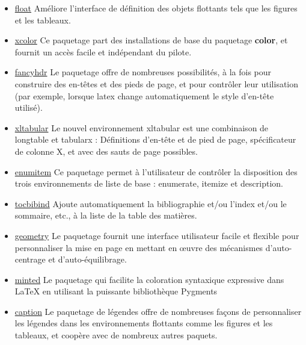 \begin{itemize}
    \item \href{https://www.ctan.org/pkg/float}{float} Améliore l'interface de définition des objets flottants
          tels que les figures et les tableaux.
    \item \href{https://www.ctan.org/pkg/xcolor}{xcolor} Ce paquetage part des installations de base
          du paquetage \textbf{color}, et fournit un accès facile et indépendant du pilote.
    \item \href{https://www.ctan.org/pkg/fancyhdr}{fancyhdr} Le paquetage offre de nombreuses possibilités,
          à la fois pour construire des en-têtes et des pieds de page, et pour contrôler leur
          utilisation (par exemple, lorsque \gls{latex} change automatiquement le style d'en-tête utilisé).
    \item \href{https://www.ctan.org/pkg/xltabular}{xltabular} Le nouvel environnement xltabular est une combinaison
          de longtable et tabularx : Définitions d'en-tête et de pied de page, spécificateur de colonne X,
          et avec des sauts de page possibles.
    \item \href{https://www.ctan.org/pkg/enumitem}{enumitem} Ce paquetage permet à l'utilisateur de contrôler
          la disposition des trois environnements de liste de base : enumerate, itemize et description.
    \item \href{https://www.ctan.org/pkg/tocbibind}{tocbibind} Ajoute automatiquement la bibliographie et/ou
          l'index et/ou le sommaire, etc., à la liste de la table des matières.
    \item \href{https://www.ctan.org/pkg/geometry}{geometry} Le paquetage fournit une interface
          utilisateur facile et flexible pour personnaliser la mise en page en mettant en œuvre des mécanismes
          d'auto-centrage et d'auto-équilibrage.
    \item \href{https://www.ctan.org/pkg/minted}{minted} Le paquetage qui facilite la coloration syntaxique expressive dans
          LaTeX en utilisant la puissante bibliothèque Pygments
    \item \href{https://www.ctan.org/pkg/caption}{caption} Le paquetage de légendes offre de nombreuses façons de
          personnaliser les légendes dans les environnements flottants comme les figures et les tableaux, et coopère
          avec de nombreux autres paquets.
\end{itemize}

